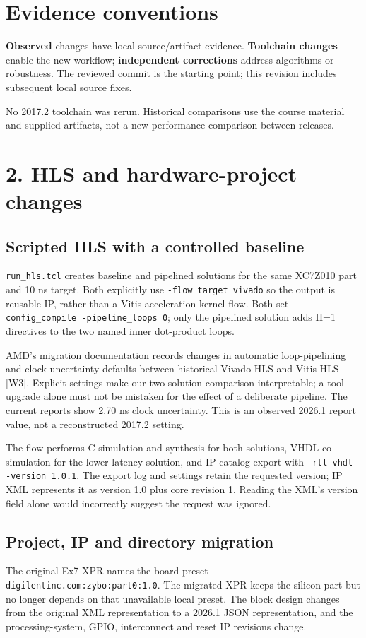 \documentclass[11pt,a4paper]{article}
\begin{document}
\section*{Evidence conventions}
\textbf{Observed} changes have local source/artifact evidence.
\textbf{Toolchain changes} enable the new workflow; \textbf{independent
corrections} address algorithms or robustness. The reviewed commit is the
starting point; this revision includes subsequent local source fixes.

No 2017.2 toolchain was rerun. Historical comparisons use the course material
and supplied artifacts, not a new performance comparison between releases.

\newpage
\section*{2. HLS and hardware-project changes}
\subsection*{Scripted HLS with a controlled baseline}
\texttt{run\_hls.tcl} creates baseline and pipelined solutions for the same
XC7Z010 part and 10 ns target. Both explicitly use \texttt{-flow\_target vivado}
so the output is reusable IP, rather than a Vitis acceleration kernel flow.
Both set \texttt{config\_compile -pipeline\_loops 0}; only the pipelined
solution adds II=1 directives to the two named inner dot-product loops.

AMD's migration documentation records changes in automatic loop-pipelining and
clock-uncertainty defaults between historical Vivado HLS and Vitis HLS [W3].
Explicit settings make our two-solution comparison interpretable; a tool
upgrade alone must not be mistaken for the effect of a deliberate pipeline.
The current reports show 2.70 ns clock uncertainty. This is an observed 2026.1
report value, not a reconstructed 2017.2 setting.

The flow performs C simulation and synthesis for both solutions, VHDL
co-simulation for the lower-latency solution, and IP-catalog export with
\texttt{-rtl vhdl -version 1.0.1}. The export log and settings retain the
requested version; IP XML represents it as version 1.0 plus core revision 1.
Reading the XML's version field alone would incorrectly suggest the request
was ignored.

\subsection*{Project, IP and directory migration}
The original Ex7 XPR names the board preset
\texttt{digilentinc.com:zybo:part0:1.0}. The migrated XPR keeps the silicon part
but no longer depends on that unavailable local preset. The block design
changes from the original XML representation to a 2026.1 JSON representation,
and the processing-system, GPIO, interconnect and reset IP revisions change.
\end{document}
